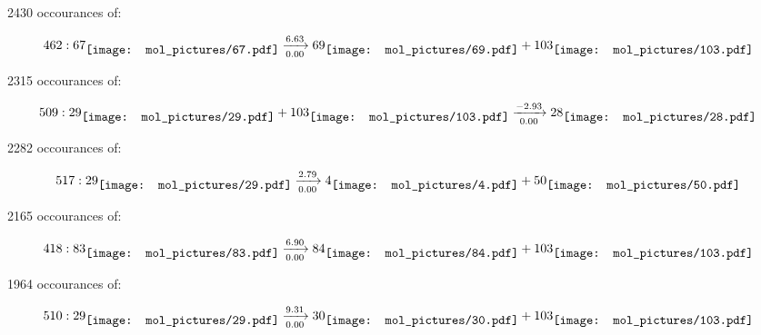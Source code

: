 \documentclass{article}
\begin{document}
\vspace{1cm}


2430 occourances of:

$$
462:  
67
\raisebox{-.5\height}{\texttt{[image: mol\_pictures/67.pdf]}}
\xrightarrow[0.00]{6.63}
69
\raisebox{-.5\height}{\texttt{[image: mol\_pictures/69.pdf]}}
+
103
\raisebox{-.5\height}{\texttt{[image: mol\_pictures/103.pdf]}}
$$



\vspace{1cm}


2315 occourances of:

$$
509:  
29
\raisebox{-.5\height}{\texttt{[image: mol\_pictures/29.pdf]}}
+
103
\raisebox{-.5\height}{\texttt{[image: mol\_pictures/103.pdf]}}
\xrightarrow[0.00]{-2.93}
28
\raisebox{-.5\height}{\texttt{[image: mol\_pictures/28.pdf]}}
$$



\vspace{1cm}


2282 occourances of:

$$
517:  
29
\raisebox{-.5\height}{\texttt{[image: mol\_pictures/29.pdf]}}
\xrightarrow[0.00]{2.79}
4
\raisebox{-.5\height}{\texttt{[image: mol\_pictures/4.pdf]}}
+
50
\raisebox{-.5\height}{\texttt{[image: mol\_pictures/50.pdf]}}
$$



\vspace{1cm}


2165 occourances of:

$$
418:  
83
\raisebox{-.5\height}{\texttt{[image: mol\_pictures/83.pdf]}}
\xrightarrow[0.00]{6.90}
84
\raisebox{-.5\height}{\texttt{[image: mol\_pictures/84.pdf]}}
+
103
\raisebox{-.5\height}{\texttt{[image: mol\_pictures/103.pdf]}}
$$



\vspace{1cm}


1964 occourances of:

$$
510:  
29
\raisebox{-.5\height}{\texttt{[image: mol\_pictures/29.pdf]}}
\xrightarrow[0.00]{9.31}
30
\raisebox{-.5\height}{\texttt{[image: mol\_pictures/30.pdf]}}
+
103
\raisebox{-.5\height}{\texttt{[image: mol\_pictures/103.pdf]}}
$$



\vspace{1cm}
\end{document}
